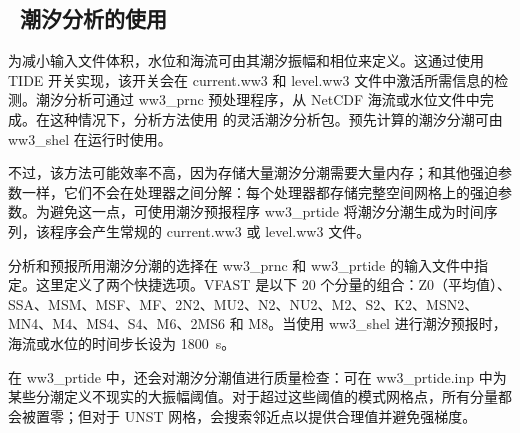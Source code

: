 \vssub
\subsection{~潮汐分析的使用} \label{sub:num_tide}

\noindent
为减小输入文件体积，水位和海流可由其潮汐振幅和相位来定义。这通过使用 {\code TIDE} 开关实现，该开关会在 current.ww3 和 level.ww3 文件中激活所需信息的检测。潮汐分析可通过 {\file
  ww3\_prnc} 预处理程序，从 NetCDF 海流或水位文件中完成。在这种情况下，分析方法使用 \cite{art:For09} 的灵活潮汐分析包。预先计算的潮汐分潮可由 {\file ww3\_shel} 在运行时使用。

不过，该方法可能效率不高，因为存储大量潮汐分潮需要大量内存；和其他强迫参数一样，它们不会在处理器之间分解：每个处理器都存储完整空间网格上的强迫参数。为避免这一点，可使用潮汐预报程序 {\file ww3\_prtide} 将潮汐分潮生成为时间序列，该程序会产生常规的 {\file current.ww3} 或
{\file level.ww3} 文件。

分析和预报所用潮汐分潮的选择在 {\file ww3\_prnc} 和 {\file ww3\_prtide} 的输入文件中指定。这里定义了两个快捷选项。{\code VFAST} 是以下 20 个分量的组合：Z0（平均值）、SSA、MSM、MSF、MF、2N2、MU2、N2、NU2、M2、S2、K2、MSN2、
MN4、M4、MS4、S4、M6、2MS6 和 M8。当使用 {\code ww3\_shel} 进行潮汐预报时，海流或水位的时间步长设为 1800~s。

在 {\file ww3\_prtide} 中，还会对潮汐分潮值进行质量检查：可在 {\file ww3\_prtide.inp} 中为某些分潮定义不现实的大振幅阈值。对于超过这些阈值的模式网格点，所有分量都会被置零；但对于 UNST 网格，会搜索邻近点以提供合理值并避免强梯度。
